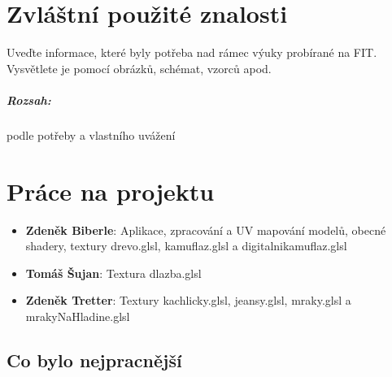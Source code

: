\documentclass[12pt,a4paper,titlepage,final]{report}
\newcommand\AuthorA{Zdeněk Biberle}
\newcommand\AuthorB{Tomáš Šujan}
\newcommand\AuthorC{Zdeněk Tretter}
\begin{document}
  


\chapter{Zvláštní použité znalosti}

Uveďte informace, které byly potřeba nad rámec výuky probírané na FIT.
Vysvětlete je pomocí obrázků, schémat, vzorců apod. 

\paragraph{Rozsah:} podle potřeby a vlastního uvážení


\chapter{Práce na projektu}

\begin{itemize}
\item \textbf{\AuthorA}: Aplikace, zpracování a UV mapování modelů, obecné shadery, textury drevo.glsl, kamuflaz.glsl a digitalnikamuflaz.glsl
\item \textbf{\AuthorB}: Textura dlazba.glsl
\item \textbf{\AuthorC}: Textury kachlicky.glsl, jeansy.glsl, mraky.glsl a mrakyNaHladine.glsl
\end{itemize}

\section{Co bylo nejpracnější}
\end{document}
